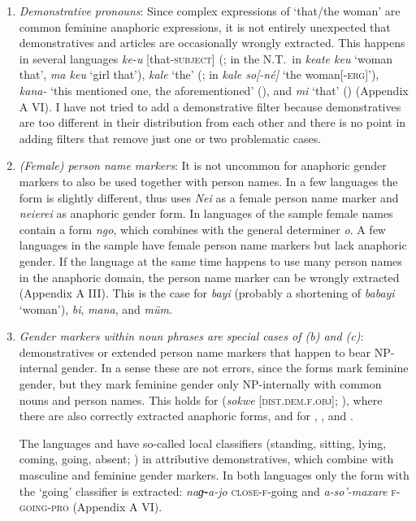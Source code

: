 \documentclass[output=collectionpaper]{langsci/langscibook}
\begin{document}
\begin{enumerate}[label=(\alph*)]
\item
\emph{Demonstrative pronouns}: Since complex expressions of ‘that/the woman’ are common feminine anaphoric expressions, it is not entirely unexpected that demonstratives and articles are occasionally wrongly extracted. This happens in several  languages  \textit{ke-u} [that-\textsc{subject}] (\citealt[428]{Garland1975}; in the N.T.\ in \textit{keate keu} ‘woman that’, \textit{ma keu} ‘girl that’),  \textit{kale} ‘the’ (\citealt[85]{Anderson1989}; in \textit{kale so[-né]} ‘the woman[-\textsc{erg}]’),  \textit{kana-}
‘this mentioned one, the aforementioned’ (\citealt[45]{Scott1989}), and  \textit{mi} ‘that’ (\citealt{Lowing1975}) (Appendix A VI). I have not tried to add a demonstrative filter because demonstratives are too different in their distribution from each other and there is no point in adding filters that remove just one or two problematic cases.
\item
\emph{(Female) person name markers}: It is not uncommon for anaphoric gender markers to also be used together with person names. In a few languages the form is slightly different, thus  uses \textit{Nei} as a female person name marker and \textit{neierei} as anaphoric gender form. In  languages of the sample female names contain a form \textit{ngo}, which combines with the general determiner \textit{o}. A few languages in the sample have female person name markers but lack anaphoric gender. If the language at the same time happens to use many person names in the anaphoric domain, the person name marker can be wrongly extracted (Appendix A III). This is the case for  \textit{bayi} (probably a shortening of \textit{babayi} ‘woman’),  \textit{bi},  \textit{mana}, and  \textit{müm}.
\item
\emph{Gender markers within noun phrases are special cases of (b) and (c)}: demonstratives or extended person name markers that happen to bear NP-inter\-nal gender. In a sense these are not errors, since the forms mark feminine gender, but they mark feminine gender only NP-internally with common nouns and person names. This holds for  (\textit{sokwe} [\textsc{dist.dem.f.obj}]; \citealt[87]{Lock2011}), where there are also correctly extracted anaphoric forms, and for , , and .

The  languages  and  have so-called local classifiers (standing, sitting, lying, coming, going, absent; \citealt[62]{Sandalo1997}) in attributive demonstratives, which combine with masculine and feminine gender markers. In both languages only the form with the ‘going’ classifier is extracted:  \textit{naɡ̶-a-jo} \textsc{close-f}-going and  \textit{a-so'-maxare} \textsc{f-going-pro} (Appendix A VI).


\end{enumerate}
\end{document}
